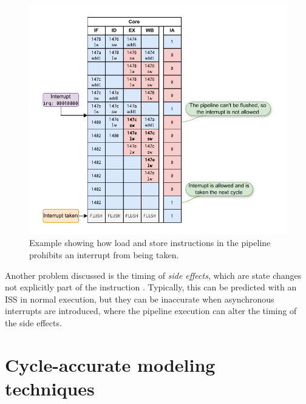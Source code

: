 \begin{figure}
    \centering
    \includegraphics[width=1.00\linewidth]{figures/lw_sw_pipeline_example.pdf}
    \caption{Example showing how load and store instructions in the pipeline prohibits an interrupt from being taken.}
    \label{fig:lw_sw_pipeline}
\end{figure}


Another problem discussed is the timing of \textit{side effects}, which are state changes not explicitly part of the instruction \cite{taylorAdvancedRISCVVerification2023}. Typically, this can be predicted with an ISS in normal execution, but they can be inaccurate when asynchronous interrupts are introduced, where the pipeline execution can alter the timing of the side effects.










\section{Cycle-accurate modeling techniques}
\label{sec:bg_cycle-accurate}

